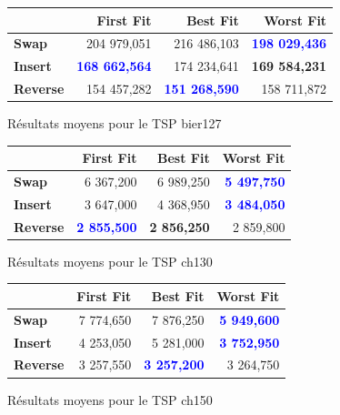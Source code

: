 \documentclass[a4paper,10pt]{report}
\begin{document}
\begin{figure}[H]
  \begin{center}
    \begin{tabular}{|l|r|r|r|}
      \hline
      &		\textbf{First Fit}&	\textbf{Best Fit}&	\textbf{Worst
Fit}\\\hline
      \textbf{Swap}&
	  204 979,051&
	  216 486,103&
	  \textbf{\textcolor{blue}{198 029,436}}\\\hline
      \textbf{Insert}&
	  \textbf{\textcolor{blue}{168 662,564}}&
	  174 234,641&
	  \textbf{169 584,231}\\\hline
      \textbf{Reverse}&
	  154 457,282&
	  \textbf{\textcolor{blue}{151 268,590}}&
	  158 711,872\\\hline
    \end{tabular}
    \caption{Résultats moyens pour le TSP bier127}
  \end{center}
\end{figure}

\begin{figure}[h]
  \begin{center}
    \begin{tabular}{|l|r|r|r|}
      \hline
      &		\textbf{First Fit}&	\textbf{Best Fit}&	\textbf{Worst
Fit}\\\hline
      \textbf{Swap}&
	  6 367,200&
	  6 989,250&
	  \textbf{\textcolor{blue}{5 497,750}}\\\hline
      \textbf{Insert}&
	  3 647,000&
	  4 368,950&
	  \textbf{\textcolor{blue}{3 484,050}}\\\hline
      \textbf{Reverse}&
	  \textbf{\textcolor{blue}{2 855,500}}&
	  \textbf{2 856,250}&
	  2 859,800\\\hline
    \end{tabular}
    \caption{Résultats moyens pour le TSP ch130}
  \end{center}
\end{figure}

\begin{figure}[H]
  \begin{center}
    \begin{tabular}{|l|r|r|r|}
      \hline
      &		\textbf{First Fit}&	\textbf{Best Fit}&	\textbf{Worst
Fit}\\\hline
      \textbf{Swap}&
	  7 774,650&
	  7 876,250&
	  \textbf{\textcolor{blue}{5 949,600}}\\\hline
      \textbf{Insert}&
	  4 253,050&
	  5 281,000&
	  \textbf{\textcolor{blue}{3 752,950}}\\\hline
      \textbf{Reverse}&
	  3 257,550&
	  \textbf{\textcolor{blue}{3 257,200}}&
	  3 264,750\\\hline
    \end{tabular}
    \caption{Résultats moyens pour le TSP ch150}
  \end{center}
\end{figure}
\end{document}

